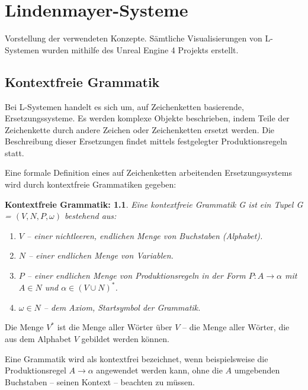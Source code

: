 \chapter{Lindenmayer-Systeme}

Vorstellung der verwendeten Konzepte. Sämtliche Visualisierungen von L-Systemen wurden mithilfe des Unreal Engine 4 Projekts erstellt.

\section{Kontextfreie Grammatik}

Bei L-Systemen handelt es sich um, auf Zeichenketten basierende, Ersetzungssysteme. Es werden komplexe Objekte beschrieben, indem Teile der Zeichenkette durch andere Zeichen oder Zeichenketten ersetzt werden. Die Beschreibung dieser Ersetzungen findet mittels festgelegter Produktionsregeln statt. \cite[S.2]{ABOP:04} 

Eine formale Definition eines auf Zeichenketten arbeitenden Ersetzungssystems wird durch kontextfreie Grammatiken gegeben:

\newtheorem{defKontextfreieGrammatik}{Kontextfreie Grammatik:}[chapter]
\begin{defKontextfreieGrammatik}
	Eine kontextfreie Grammatik G ist ein Tupel G = $(V, N, P, \omega)$ bestehend aus:
	\begin{enumerate}
		\item $V$ -- einer nichtleeren, endlichen Menge von Buchstaben (Alphabet).
		\item $N$ -- einer endlichen Menge von Variablen.
		\item $P$ -- einer endlichen Menge von Produktionsregeln in der Form $P: A \rightarrow \alpha$ mit $A \in N$ und $\alpha \in (V \cup N )^*$.
		\item $\omega \in N$ -- dem Axiom, Startsymbol der Grammatik.
	\end{enumerate}
	\cite[S.343]{ThI:14}
\end{defKontextfreieGrammatik}

Die Menge $V^*$ ist die Menge aller Wörter über $V$ -- die Menge aller Wörter, die aus dem Alphabet $V$ gebildet werden können. \cite[S.70]{ThI:14} 

Eine Grammatik wird als kontextfrei bezeichnet, wenn beispielsweise die Produktionsregel $A \rightarrow \alpha$ angewendet werden kann, ohne die $A$ umgebenden Buchstaben -- seinen Kontext -- beachten zu müssen. \cite[S.343]{ThI:14} 

